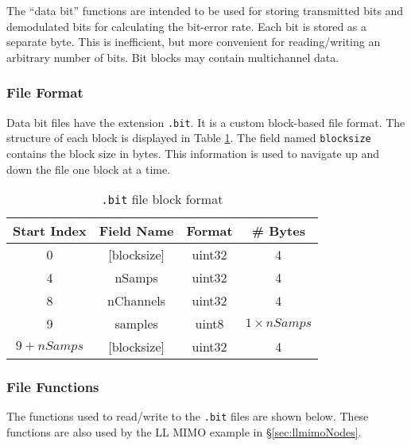 The ``data bit'' functions are intended to be used for storing
transmitted bits and demodulated bits for calculating the bit-error
rate.  Each bit is stored as a separate byte. This is inefficient,
but more convenient for reading/writing an arbitrary number of bits.
Bit blocks may contain multichannel data.

\subsubsection{File Format}

Data bit files have the extension \verb+.bit+.  It is a custom
block-based file format.  The structure of each block is displayed
in Table \ref{tab:bitFileFormat}.  The field named \verb+blocksize+
contains the block size in bytes.  This information is used to
navigate up and down the file one block at a time.

\renewcommand\arraystretch{1.5}
\begin{table}[h]
\caption{\texttt{.bit} file block format} \label{tab:bitFileFormat}
\begin{center}
\begin{tabular}{|c|c|c|c|}
\hline
 Start Index  &   Field Name   &   Format    &   \# Bytes\\
\hline \hline
       0      &   [blocksize]  &   uint32    &       4\\
\hline
       4      &    nSamps      &   uint32    &       4\\
\hline
       8      &    nChannels   &   uint32    &       4\\
\hline
       9      &    samples     &   uint8     &     $1 \times nSamps$\\
\hline
    $9+nSamps$  &   [blocksize]  &   uint32    &       4\\
\hline
\end{tabular}
\end{center}
\end{table}

\subsubsection{File Functions}

The functions used to read/write to the \verb+.bit+ files are shown
below.  These functions are also used by the LL MIMO example in
\S\ref{sec:llmimoNodes}.

